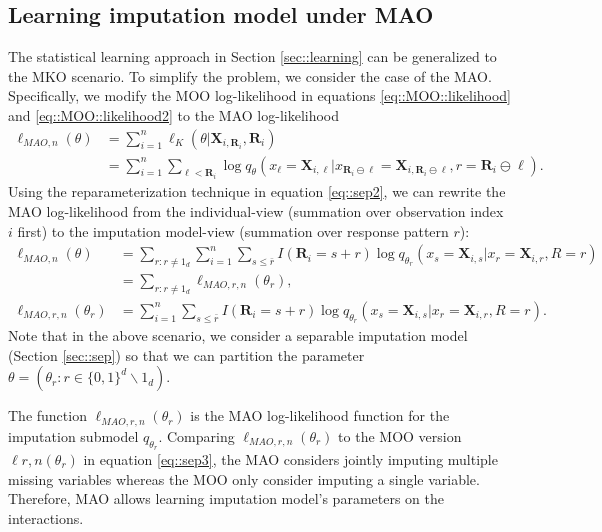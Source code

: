 \documentclass[aos, preprint]{imsart}
\theoremstyle{plain}
\theoremstyle{definition}
\newcommand{\bX}{\mathbf{X}}
\newcommand{\bR}{\mathbf{R}}
\begin{document}
\begin{appendix}
\subsection{Learning imputation model under MAO}	\label{sec::learning::mao}
The statistical learning approach in Section \ref{sec::learning}
can be generalized to the MKO scenario. 
To simplify the problem, we consider the case of the MAO.
Specifically, we  modify the MOO log-likelihood in equations \eqref{eq::MOO::likelihood}
and \eqref{eq::MOO::likelihood2}
to the MAO log-likelihood
\begin{equation}
\begin{aligned}
\ell_{MAO,n}(\theta)&=  \sum_{i=1}^n \ell_K(\theta|\bX_{i,\bR_i},\bR_i) \\
& = \sum_{i=1}^n\sum_{\ell < \bR_i} \log q_\theta(x_\ell =\bX_{i,\ell}|x_{ \bR_i\ominus \ell} = \bX_{i, \bR_i\ominus \ell}, r = \bR_i\ominus \ell).
\label{eq::MAO::likelihood}
\end{aligned}
\end{equation}
Using the reparameterization technique in equation \eqref{eq::sep2},
we can rewrite the MAO log-likelihood from
the individual-view (summation over observation index $i$ first)
to the imputation model-view (summation over response pattern $r$):
\begin{equation}
\begin{aligned}
\ell_{MAO,n}(\theta)& = \sum_{r:r\neq 1_d} \sum_{i=1}^n \sum_{s\leq  \bar r} I( \bR_i =  s+r) \log q_{\theta_r}(x_s = \bX_{i,s}|x_r = \bX_{i,r}, R=r)\\
& =  \sum_{r:r\neq 1_d} \ell_{MAO, r,n} (\theta_r),\\
\ell_{MAO, r,n} (\theta_r) & = \sum_{i=1}^n \sum_{s\leq  \bar r} I( \bR_i =  s+r) \log q_{\theta_r}(x_s = \bX_{i,s}|x_r = \bX_{i,r}, R=r).
\end{aligned}
\end{equation}
Note that in the above scenario, we consider a separable imputation model (Section \ref{sec::sep})
so that we can partition the parameter $\theta = (\theta_r: r\in\{0,1\}^d\backslash 1_d)$. 

The function $\ell_{MAO, r,n} (\theta_r)$
is the MAO log-likelihood function
for the imputation submodel $ q_{\theta_r}$. 
Comparing $\ell_{MAO, r,n} (\theta_r)$ to the MOO version $\ell{r,n}(\theta_r)$ in equation \eqref{eq::sep3},
the MAO considers jointly imputing multiple missing variables 
whereas the MOO only consider imputing a single variable. 
Therefore, MAO allows learning imputation model's parameters on the 
interactions. 


\end{appendix}
\end{document}
